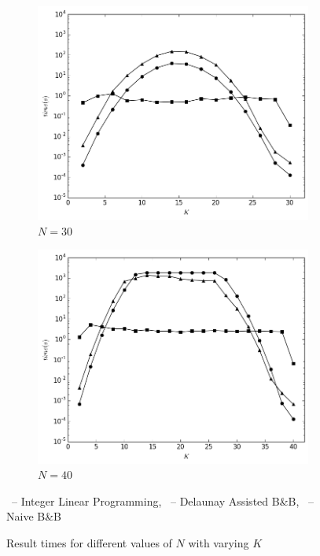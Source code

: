 \begin{figure}[H]
\begin{subfigure}[b]{0.5\linewidth}
    \includegraphics[width=0.9\linewidth]{Pictures/n30} 
    \caption{$N=30$} 
    \label{fig:fixed_n:c} 
  \end{subfigure}%
  \begin{subfigure}[b]{0.5\linewidth}
    \centering
    \includegraphics[width=0.9\linewidth]{Pictures/n40} 
    \caption{$N=40$} 
    \label{fig:fixed_n:d} 
  \end{subfigure} 
  \vspace{2ex}
  \smark\ -- Integer Linear Programming, \tmark\ -- Delaunay Assisted B\&B, \cmark\ -- Naive B\&B
  \caption{Result times for different values of $N$ with varying $K$}
  \label{fig:fixed_n} 
\end{figure}

